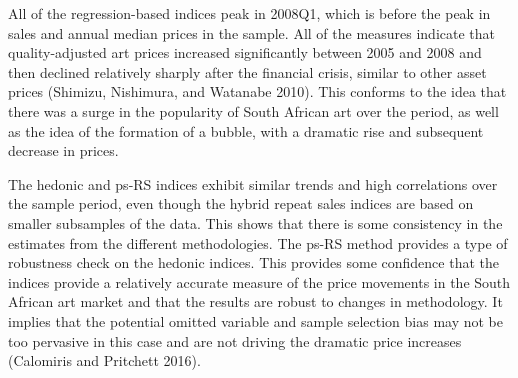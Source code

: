 \documentclass[]{elsarticle} %
\begin{document}
\begin{table}[ht]
\centering
\caption{Correlations in growth rates (dlogs)} 
\end{table}

All of the regression-based indices peak in 2008Q1, which is before the
peak in sales and annual median prices in the sample. All of the
measures indicate that quality-adjusted art prices increased
significantly between 2005 and 2008 and then declined relatively sharply
after the financial crisis, similar to other asset prices (Shimizu,
Nishimura, and Watanabe 2010). This conforms to the idea that there was
a surge in the popularity of South African art over the period, as well
as the idea of the formation of a bubble, with a dramatic rise and
subsequent decrease in prices.

The hedonic and ps-RS indices exhibit similar trends and high
correlations over the sample period, even though the hybrid repeat sales
indices are based on smaller subsamples of the data. This shows that
there is some consistency in the estimates from the different
methodologies. The ps-RS method provides a type of robustness check on
the hedonic indices. This provides some confidence that the indices
provide a relatively accurate measure of the price movements in the
South African art market and that the results are robust to changes in
methodology. It implies that the potential omitted variable and sample
selection bias may not be too pervasive in this case and are not driving
the dramatic price increases (Calomiris and Pritchett 2016).
\end{document}
